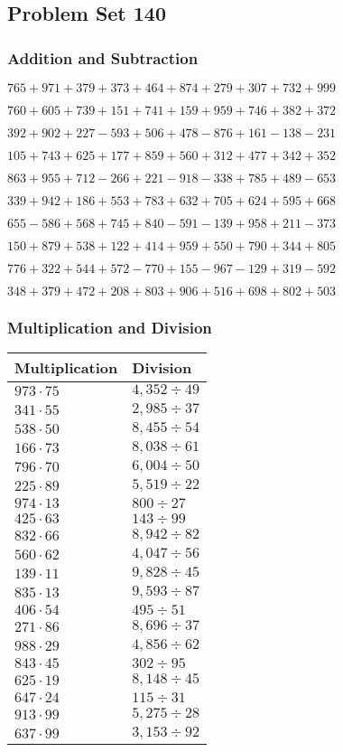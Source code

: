 \hypertarget{problem-set-140}{%
\subsection{Problem Set 140}\label{problem-set-140}}

\hypertarget{addition-and-subtraction}{%
\subsubsection{Addition and
Subtraction}\label{addition-and-subtraction}}

\(765 +971 +379 +373 +464 +874 +279 +307 +732 +999\)

\(760 +605 +739 +151 +741 +159 +959 +746 +382 +372\)

\(392 +902 +227 - 593 +506 +478 - 876 +161 - 138 - 231\)

\(105 +743 +625 +177 +859 +560 +312 +477 +342 +352\)

\(863 +955 +712 - 266 +221 - 918 - 338 +785 +489 - 653\)

\(339 +942 +186 +553 +783 +632 +705 +624 +595 +668\)

\(655 - 586 +568 +745 +840 - 591 - 139 +958 +211 - 373\)

\(150 +879 +538 +122 +414 +959 +550 +790 +344 +805\)

\(776 +322 +544 +572 - 770 +155 - 967 - 129 +319 - 592\)

\(348 +379 +472 +208 +803 +906 +516 +698 +802 +503\)

\hypertarget{multiplication-and-division}{%
\subsubsection{Multiplication and
Division}\label{multiplication-and-division}}

\begin{longtable}[]{@{}ll@{}}
\toprule
Multiplication & Division\tabularnewline
\midrule
\endhead
\(973 \cdot 75\) & \(4,352÷49\)\tabularnewline
\(341 \cdot 55\) & \(2,985÷37\)\tabularnewline
\(538 \cdot 50\) & \(8,455÷54\)\tabularnewline
\(166 \cdot 73\) & \(8,038÷61\)\tabularnewline
\(796 \cdot 70\) & \(6,004÷50\)\tabularnewline
\(225 \cdot 89\) & \(5,519÷22\)\tabularnewline
\(974 \cdot 13\) & \(800÷27\)\tabularnewline
\(425 \cdot 63\) & \(143÷99\)\tabularnewline
\(832 \cdot 66\) & \(8,942÷82\)\tabularnewline
\(560 \cdot 62\) & \(4,047÷56\)\tabularnewline
\(139 \cdot 11\) & \(9,828÷45\)\tabularnewline
\(835 \cdot 13\) & \(9,593÷87\)\tabularnewline
\(406 \cdot 54\) & \(495÷51\)\tabularnewline
\(271 \cdot 86\) & \(8,696÷37\)\tabularnewline
\(988 \cdot 29\) & \(4,856÷62\)\tabularnewline
\(843 \cdot 45\) & \(302÷95\)\tabularnewline
\(625 \cdot 19\) & \(8,148÷45\)\tabularnewline
\(647 \cdot 24\) & \(115÷31\)\tabularnewline
\(913 \cdot 99\) & \(5,275÷28\)\tabularnewline
\(637 \cdot 99\) & \(3,153÷92\)\tabularnewline
\bottomrule
\end{longtable}
